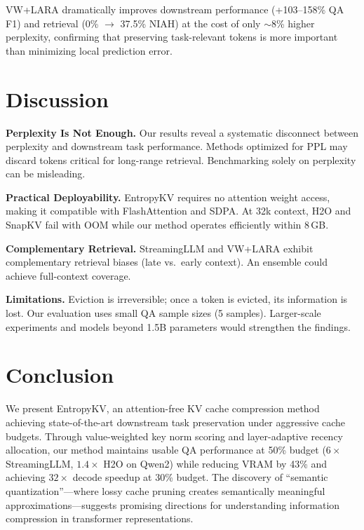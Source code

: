 \documentclass{article}
\begin{document}
VW+LARA dramatically improves downstream performance (+103--158\% QA F1) and retrieval (0\% $\rightarrow$ 37.5\% NIAH) at the cost of only $\sim$8\% higher perplexity, confirming that preserving task-relevant tokens is more important than minimizing local prediction error.

\section{Discussion}

\textbf{Perplexity Is Not Enough.} Our results reveal a systematic disconnect between perplexity and downstream task performance. Methods optimized for PPL may discard tokens critical for long-range retrieval. Benchmarking solely on perplexity can be misleading.

\textbf{Practical Deployability.} EntropyKV requires no attention weight access, making it compatible with FlashAttention and SDPA. At 32k context, H2O and SnapKV fail with OOM while our method operates efficiently within 8\,GB.

\textbf{Complementary Retrieval.} StreamingLLM and VW+LARA exhibit complementary retrieval biases (late vs.\ early context). An ensemble could achieve full-context coverage.

\textbf{Limitations.} Eviction is irreversible; once a token is evicted, its information is lost. Our evaluation uses small QA sample sizes (5 samples). Larger-scale experiments and models beyond 1.5B parameters would strengthen the findings.

\section{Conclusion}

We present EntropyKV, an attention-free KV cache compression method achieving state-of-the-art downstream task preservation under aggressive cache budgets. Through value-weighted key norm scoring and layer-adaptive recency allocation, our method maintains usable QA performance at 50\% budget ($6\times$ StreamingLLM, $1.4\times$ H2O on Qwen2) while reducing VRAM by 43\% and achieving $32\times$ decode speedup at 30\% budget. The discovery of ``semantic quantization''---where lossy cache pruning creates semantically meaningful approximations---suggests promising directions for understanding information compression in transformer representations.



\end{document}
